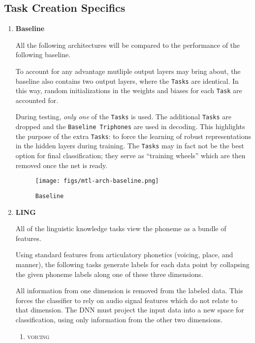 \documentclass[10pt,a4paper]{article}
\begin{document}
\subsection{Task Creation Specifics}


\begin{enumerate}

\item \textbf{Baseline}

All the following architectures will be compared to the performance of the following baseline.

To account for any advantage mutliple output layers may bring about, the baseline also contains two output layers, where the \texttt{Tasks} are identical. In this way, random initializations in the weights and biases for each \texttt{Task} are accounted for.

During testing, \textit{only one} of the \texttt{Tasks} is used. The additional \texttt{Tasks} are dropped and the \texttt{Baseline Triphones} are used in decoding. This highlights the purpose of the extra \texttt{Tasks}: to force the learning of robust representations in the hidden layers during training. The \texttt{Tasks} may in fact not be the best option for final classification; they serve as ``training wheels'' which are then removed once the net is ready. 

\begin{figure}[!htb]
  \centering
{}
  \texttt{[image: figs/mtl-arch-baseline.png]}
  \caption{\texttt{Baseline}}
\endminipage\hfill
\end{figure}



\item \textbf{LING}

  All of the linguistic knowledge tasks view the phoneme as a bundle of features.

  Using standard features from articulatory phonetics (voicing, place, and manner), the following tasks generate labels for each data point by collapsing the given phoneme labels along one of these three dimensions.

  All information from one dimension is removed from the labeled data. This forces the classifier to rely on audio signal features which do not relate to that dimension. The DNN must project the input data into a new space for classification, using only information from the other two dimensions. 

  
  \begin{enumerate}
  \item \textsc{voicing}


\end{enumerate}
\end{enumerate}
\end{document}
